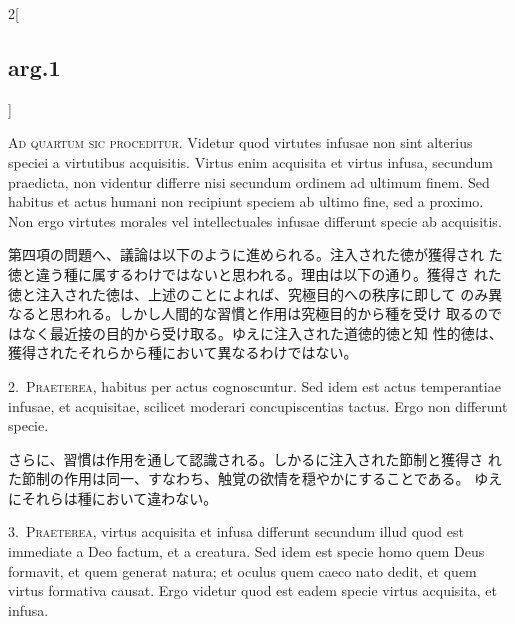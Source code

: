\documentclass[paper=a4paper,fontsize=10pt,jafontsize=9pt,titlepage]{jlreq}
\begin{document}
\begin{paracol}{2}[\subsection{arg.1}]

{\scshape Ad quartum sic proceditur}. Videtur quod virtutes infusae
non sint alterius speciei a virtutibus acquisitis. Virtus enim
acquisita et virtus infusa, secundum praedicta, non videntur differre
nisi secundum ordinem ad ultimum finem. Sed habitus et actus humani
non recipiunt speciem ab ultimo fine, sed a proximo. Non ergo virtutes
morales vel intellectuales infusae differunt specie ab acquisitis.

\switchcolumn

第四項の問題へ、議論は以下のように進められる。注入された徳が獲得され
 た徳と違う種に属するわけではないと思われる。理由は以下の通り。獲得さ
 れた徳と注入された徳は、上述のことによれば、究極目的への秩序に即して
 のみ異なると思われる。しかし人間的な習慣と作用は究極目的から種を受け
 取るのではなく最近接の目的から受け取る。ゆえに注入された道徳的徳と知
 性的徳は、獲得されたそれらから種において異なるわけではない。


2.~{\scshape Praeterea}, habitus per actus cognoscuntur. Sed idem est
actus temperantiae infusae, et acquisitae, scilicet moderari
concupiscentias tactus. Ergo non differunt specie.

\switchcolumn

さらに、習慣は作用を通して認識される。しかるに注入された節制と獲得さ
 れた節制の作用は同一、すなわち、触覚の欲情を穏やかにすることである。
 ゆえにそれらは種において違わない。


3.~{\scshape Praeterea}, virtus acquisita et infusa differunt secundum
illud quod est immediate a Deo factum, et a creatura. Sed idem est
specie homo quem Deus formavit, et quem generat natura; et oculus quem
caeco nato dedit, et quem virtus formativa causat. Ergo videtur quod
est eadem specie virtus acquisita, et infusa.

\switchcolumn


\end{paracol}
\end{document}
